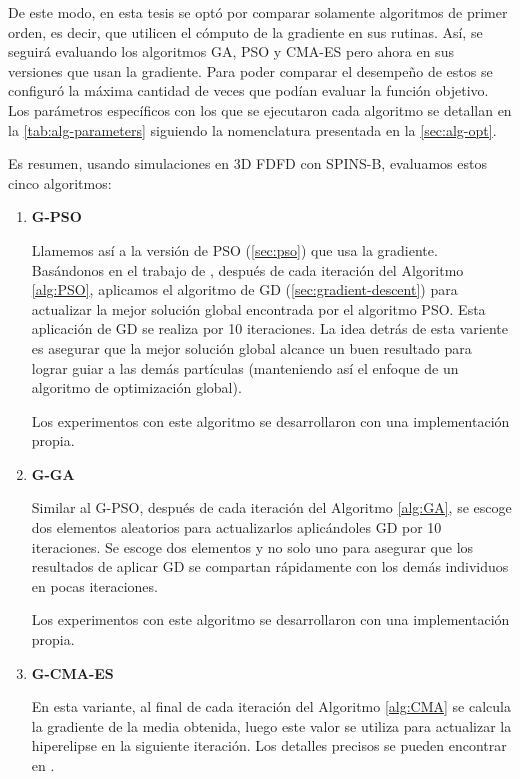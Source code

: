 De este modo, en esta tesis se optó por comparar solamente algoritmos de primer orden, es decir, que utilicen
el cómputo de la gradiente en sus rutinas. Así, se seguirá evaluando los algoritmos GA, PSO y CMA-ES pero
ahora en sus versiones que usan la gradiente.
Para poder comparar el desempeño de estos se configuró la máxima cantidad de veces que podían
evaluar la función objetivo. 
Los parámetros específicos con los que se ejecutaron cada algoritmo se detallan en la
\autoref{tab:alg-parameters} siguiendo la nomenclatura presentada en la \autoref{sec:alg-opt}.

Es resumen, usando simulaciones en 3D FDFD con SPINS-B, evaluamos estos cinco algoritmos:

\begin{enumerate}
  \item \textbf{G-PSO}

  Llamemos así a la versión de PSO (\autoref{sec:pso}) que usa la gradiente. 
  Basándonos en el trabajo de \cite{Demidova2020}, después de cada iteración
  del Algoritmo \ref{alg:PSO}, aplicamos el algoritmo de GD
  (\autoref{sec:gradient-descent}) para actualizar la mejor solución global encontrada por el 
  algoritmo PSO. Esta aplicación de GD se realiza por 10 iteraciones.
  La idea detrás de esta variente es asegurar que la mejor solución global alcance un buen resultado
  para lograr guiar a las demás partículas (manteniendo así el enfoque de un algoritmo de optimización
  global).
  
  Los experimentos con este algoritmo se desarrollaron con una implementación propia.

  \item \textbf{G-GA}

  Similar al G-PSO, después de cada iteración del Algoritmo \ref{alg:GA}, se escoge dos
  elementos aleatorios para actualizarlos aplicándoles GD por 10 iteraciones.
  Se escoge dos elementos y no solo uno para asegurar que los resultados de aplicar GD
  se compartan rápidamente con los demás individuos en pocas iteraciones.

  Los experimentos con este algoritmo se desarrollaron con una implementación propia.

  \item \textbf{G-CMA-ES}

  En esta variante, al final de cada iteración del Algoritmo \ref{alg:CMA} se
  calcula la gradiente de la media obtenida, luego este valor se utiliza para
  actualizar la hiperelipse en la siguiente iteración.
  Los detalles precisos se pueden encontrar en \cite{Nikolaus2021}.


\end{enumerate}
